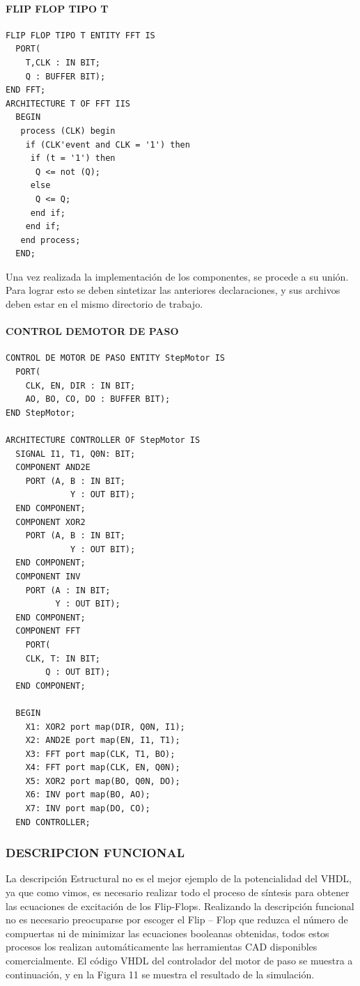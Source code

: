 \paragraph[FLIP FLOP TIPO T]{ FLIP FLOP TIPO T}
\begin{lstlisting}
FLIP FLOP TIPO T ENTITY FFT IS
  PORT(
    T,CLK : IN BIT;
    Q : BUFFER BIT);
END FFT;
ARCHITECTURE T OF FFT IIS
  BEGIN
   process (CLK) begin
    if (CLK'event and CLK = '1') then
     if (t = '1') then
      Q <= not (Q);
     else
      Q <= Q;
     end if;
    end if;
   end process;
  END;
\end{lstlisting}


Una vez realizada la implementación de los componentes, se procede a su unión. Para lograr esto se deben sintetizar las anteriores declaraciones, y sus archivos deben estar en el mismo directorio de trabajo.

\paragraph[CONTROL DE MOTOR DE PASO]{ CONTROL DEMOTOR DE PASO}
\begin{lstlisting}
CONTROL DE MOTOR DE PASO ENTITY StepMotor IS
  PORT(
    CLK, EN, DIR : IN BIT;
    AO, BO, CO, DO : BUFFER BIT);
END StepMotor;

ARCHITECTURE CONTROLLER OF StepMotor IS
  SIGNAL I1, T1, Q0N: BIT;
  COMPONENT AND2E
    PORT (A, B : IN BIT;
             Y : OUT BIT);
  END COMPONENT;
  COMPONENT XOR2
    PORT (A, B : IN BIT;
             Y : OUT BIT);
  END COMPONENT;
  COMPONENT INV
    PORT (A : IN BIT;
          Y : OUT BIT);
  END COMPONENT;
  COMPONENT FFT
    PORT(
    CLK, T: IN BIT;
        Q : OUT BIT);
  END COMPONENT;

  BEGIN
    X1: XOR2 port map(DIR, Q0N, I1);
    X2: AND2E port map(EN, I1, T1);
    X3: FFT port map(CLK, T1, BO);
    X4: FFT port map(CLK, EN, Q0N);
    X5: XOR2 port map(BO, Q0N, DO);
    X6: INV port map(BO, AO);
    X7: INV port map(DO, CO);
  END CONTROLLER;
\end{lstlisting}

\subsubsection[DESCRIPCION FUNCIONAL]{DESCRIPCION FUNCIONAL}

La descripción Estructural no es el mejor ejemplo de la potencialidad del VHDL, ya que como vimos, es necesario realizar todo el proceso de  síntesis para obtener las ecuaciones de excitación de los Flip-Flops. Realizando la descripción funcional no es necesario preocuparse por escoger el Flip -- Flop que reduzca el número de compuertas ni de minimizar las ecuaciones booleanas obtenidas, todos estos procesos los realizan automáticamente las herramientas CAD disponibles comercialmente. El código VHDL del controlador del motor de paso se muestra a continuación, y en la Figura 11 se muestra el resultado de la simulación.


